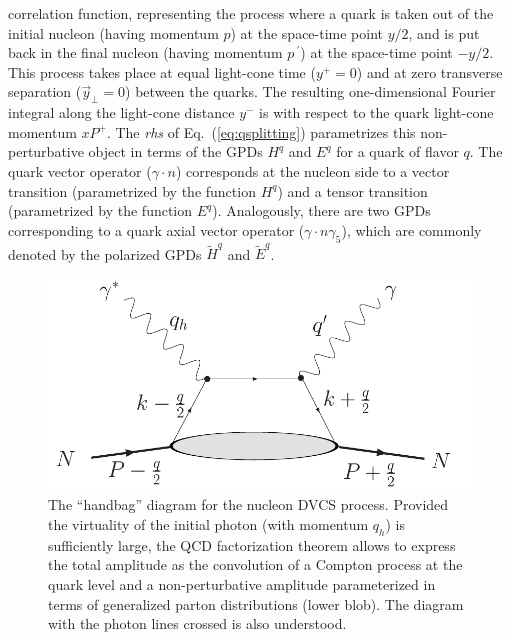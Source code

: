 correlation function, representing the process where
a quark is taken out of the
initial nucleon (having momentum $p$) at the space-time point $y/2$, and
is put back in the final nucleon (having momentum $p^{\ \prime}$) 
at the space-time
point $-y/2$. This process takes place at equal light-cone time ($y^+
= 0$) and at zero transverse separation ($\vec y_\perp = 0$) between
the quarks. The resulting one-dimensional Fourier integral along the
light-cone distance $y^-$ is with respect to the quark light-cone
momentum $x  P^+$.
The {\it rhs} of Eq.~(\ref{eq:qsplitting}) parametrizes this
non-perturbative object in terms of the GPDs $H^q$ and $E^q$ 
for a quark of flavor $q$.  
The quark vector operator ($\gamma \cdot n$) 
corresponds at the nucleon side to a vector transition 
(parametrized by the function $H^q$) and
a tensor transition (parametrized by the function $E^q$). 
Analogously, there are two GPDs corresponding to 
a quark axial vector operator ($\gamma \cdot n \gamma_5$), which are 
commonly denoted by the polarized GPDs $\tilde H^q$ and $\tilde E^q$. 

\begin{figure}[t]
\centerline{  
  \includegraphics[width = 6 cm]{n_dvcs.pdf} 
}
\caption{\small 
The ``handbag'' diagram for the nucleon DVCS process. 
Provided the virtuality of the initial photon (with momentum $q_h$) 
is sufficiently large, the 
QCD factorization theorem allows to express the 
total amplitude as the convolution  
of a Compton process at the quark level and a non-perturbative 
amplitude parameterized in terms of generalized parton distributions 
(lower blob). The diagram with the photon lines crossed is also understood.    
}
\label{n_dvcs}
\end{figure}


